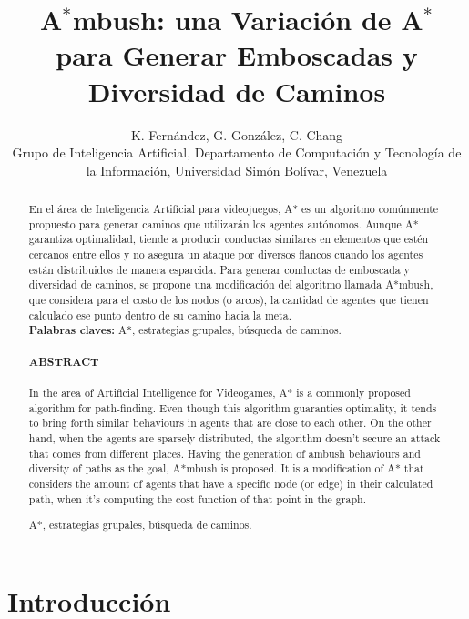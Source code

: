 \documentclass{egpubl}
\title[EG \LaTeX\ Author Guidelines]%
      {A$^*$mbush: una Variación de A$^*$ para Generar Emboscadas y Diversidad de Caminos}
\author[K. Fernández, G. González,  C. Chang]
       {K. Fernández, G. González,  C. Chang
        \\
         Grupo de Inteligencia Artificial, Departamento de Computación y Tecnología de la Información, Universidad Simón Bolívar, Venezuela\\
      }
\begin{document}
\noEGpagenumber

\maketitle

\begin{abstract}
En el área de Inteligencia Artificial para videojuegos, A* es
un algoritmo comúnmente propuesto para generar caminos que 
utilizarán los agentes autónomos. Aunque A* garantiza
optimalidad, tiende a producir conductas similares en elementos que
estén cercanos entre ellos y no asegura un ataque por diversos flancos
cuando los agentes están distribuidos de manera esparcida. Para generar
conductas de emboscada y diversidad de caminos, se propone una modificación 
del algoritmo llamada A*mbush, que considera para el costo de los nodos (o arcos), 
la cantidad de agentes que tienen calculado ese punto dentro de su camino hacia
la meta.
\\
\textbf{Palabras claves:} A*, estrategias grupales, búsqueda de caminos.
\\
\\
\textnormal{\textbf{ABSTRACT}}
\\
\\
In the area of Artificial Intelligence for Videogames, A* is a commonly proposed 
algorithm for path-finding. Even though this algorithm guaranties optimality, it 
tends to bring forth similar behaviours in agents that are close to each other. On the
other hand, when the agents are sparsely distributed, the algorithm doesn't secure
an attack that comes from different places. Having the generation of ambush
behaviours and diversity of paths as the goal, A*mbush is proposed. It is a 
modification of A* that considers the amount of agents that have a specific
node (or edge) in their calculated path, when it's computing the cost function of that 
point in the graph.


%
\begin{keywords}
A*, estrategias grupales, búsqueda de caminos.
\end{keywords}

\end{abstract}





\section{Introducción}
\end{document}
